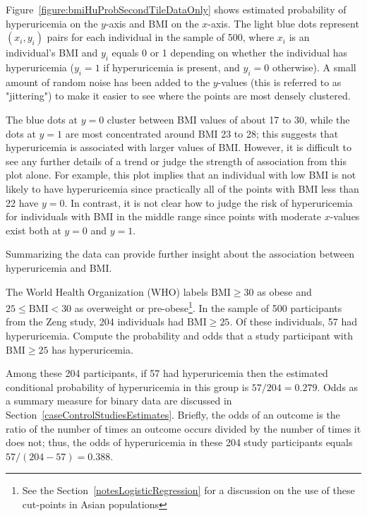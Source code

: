 Figure~\ref{figure:bmiHuProbSecondTileDataOnly} shows estimated probability of hyperuricemia on the $y$-axis and BMI on the $x$-axis. The light blue dots represent $(x_i, y_i)$ pairs for each individual in the sample of 500, where $x_i$ is an individual's BMI and $y_i$ equals 0 or 1 depending on whether the individual has hyperuricemia ($y_i= 1$ if hyperuricemia is present, and $y_i = 0$ otherwise). A small amount of random noise has been added to the $y$-values (this is referred to as "jittering") to make it easier to see where the points are most densely clustered.

The blue dots at $y = 0$ cluster between BMI values of about 17 to 30, while the dots at $y = 1$ are most concentrated around BMI 23 to 28; this suggests that hyperuricemia is associated with larger values of BMI. However, it is difficult to see any further details of a trend or judge the strength of association from this plot alone. For example, this plot implies that an individual with low BMI is not likely to have hyperuricemia since practically all of the points with BMI less than 22 have $y = 0$. In contrast, it is not clear how to judge the risk of hyperuricemia for individuals with BMI in the middle range since points with moderate $x$-values exist both at $y = 0$ and $y = 1$.

Summarizing the data can provide further insight about the association between hyperuricemia and BMI.

\begin{examplewrap}
\begin{nexample}{The World Health Organization (WHO) labels $\text{BMI} \ge 30$ as obese and $25 \le \text{BMI} < 30$ as overweight or pre-obese\footnote{See the Section~\ref{notesLogisticRegression} for a discussion on the use of these cut-points in Asian populations}. In the sample of 500 participants from the Zeng study, 204 individuals had $\text{BMI} \geq 25$. Of these individuals, 57 had hyperuricemia. Compute the probability and odds that a study participant with $\text{BMI} \ge 25$ has hyperuricemia.}\label{example:preobeseHyperurcemia}

    Among these 204 participants, if 57 had hyperuricemia then the estimated conditional probability of hyperuricemia in this group is $57/204 = 0.279$. Odds as a summary measure for binary data are discussed in Section~\ref{caseControlStudiesEstimates}. Briefly, the odds of an outcome is the ratio of the number of times an outcome occurs divided by the number of times it does not; thus, the odds of hyperuricemia in these 204 study participants equals $57/(204 - 57) = 0.388$.
\end{nexample}
\end{examplewrap}


